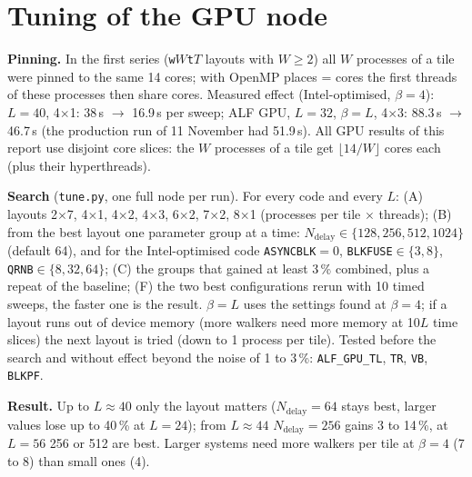 \documentclass[11pt,a4paper]{article}
\begin{document}
\section{Tuning of the GPU node}
\textbf{Pinning.} In the first series (\texttt{w}$W$\texttt{t}$T$ layouts with $W\ge2$) all $W$ processes of a tile were pinned to the same 14 cores; with OpenMP places = cores the first threads of these processes then share cores. Measured effect (Intel-optimised, $\beta=4$): $L=40$, 4$\times$1: 38\,s $\to$ 16.9\,s per sweep; ALF GPU, $L=32$, $\beta=L$, 4$\times$3: 88.3\,s $\to$ 46.7\,s (the production run of 11 November had 51.9\,s). All GPU results of this report use disjoint core slices: the $W$ processes of a tile get $\lfloor14/W\rfloor$ cores each (plus their hyperthreads).

\textbf{Search} (\texttt{tune.py}, one full node per run). For every code and every $L$: (A) layouts 2$\times$7, 4$\times$1, 4$\times$2, 4$\times$3, 6$\times$2, 7$\times$2, 8$\times$1 (processes per tile $\times$ threads); (B) from the best layout one parameter group at a time: $N_\text{delay}\in\{128,256,512,1024\}$ (default 64), and for the Intel-optimised code \texttt{ASYNCBLK}$=0$, \texttt{BLKFUSE}$\in\{3,8\}$, \texttt{QRNB}$\in\{8,32,64\}$; (C) the groups that gained at least 3\,\% combined, plus a repeat of the baseline; (F) the two best configurations rerun with 10 timed sweeps, the faster one is the result. $\beta=L$ uses the settings found at $\beta=4$; if a layout runs out of device memory (more walkers need more memory at 10$L$ time slices) the next layout is tried (down to 1 process per tile). Tested before the search and without effect beyond the noise of 1 to 3\,\%: \texttt{ALF\_GPU\_TL}, \texttt{TR}, \texttt{VB}, \texttt{BLKPF}.

\textbf{Result.} Up to $L\approx 40$ only the layout matters ($N_\text{delay}=64$ stays best, larger values lose up to 40\,\% at $L=24$); from $L\approx 44$ $N_\text{delay}=256$ gains 3 to 14\,\%, at $L=56$ 256 or 512 are best. Larger systems need more walkers per tile at $\beta=4$ (7 to 8) than small ones (4).

\begin{table}[H]\centering\small
\caption{Tuned settings per code and $L$ (best of the search; $N_\text{delay}=64$ and the production switches where not stated).}

\TunedTable
\end{table}
\end{document}
